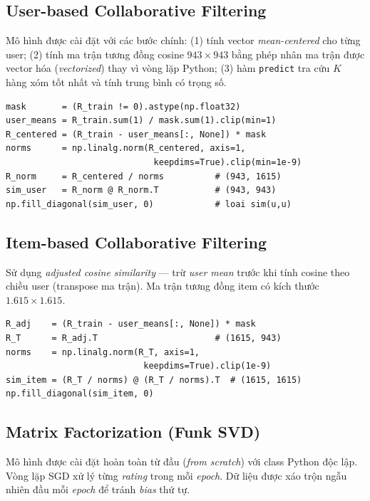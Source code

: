 \documentclass[../BTL.tex]{subfiles}
\begin{document}
\subsection{User-based Collaborative Filtering}
\label{section:3.6.1}

Mô hình được cài đặt với các bước chính: (1) tính vector
\textit{mean-centered} cho từng user; (2) tính ma trận tương đồng cosine
$943 \times 943$ bằng phép nhân ma trận được vector hóa (\textit{vectorized})
thay vì vòng lặp Python; (3) hàm \texttt{predict} tra cứu $K$ hàng xóm tốt
nhất và tính trung bình có trọng số.

\begin{lstlisting}[style=python, caption={Tính ma trận tương đồng
user-user (vectorized)}]
mask       = (R_train != 0).astype(np.float32)
user_means = R_train.sum(1) / mask.sum(1).clip(min=1)
R_centered = (R_train - user_means[:, None]) * mask
norms      = np.linalg.norm(R_centered, axis=1,
                             keepdims=True).clip(min=1e-9)
R_norm     = R_centered / norms          # (943, 1615)
sim_user   = R_norm @ R_norm.T           # (943, 943)
np.fill_diagonal(sim_user, 0)            # loai sim(u,u)
\end{lstlisting}

\subsection{Item-based Collaborative Filtering}
\label{section:3.6.2}

Sử dụng \textit{adjusted cosine similarity} — trừ \textit{user mean} trước
khi tính cosine theo chiều user (transpose ma trận). Ma trận tương đồng item
có kích thước $1.615 \times 1.615$.

\begin{lstlisting}[style=python, caption={\textit{Adjusted cosine
similarity} cho Item-based CF}]
R_adj    = (R_train - user_means[:, None]) * mask
R_T      = R_adj.T                       # (1615, 943)
norms    = np.linalg.norm(R_T, axis=1,
                           keepdims=True).clip(1e-9)
sim_item = (R_T / norms) @ (R_T / norms).T  # (1615, 1615)
np.fill_diagonal(sim_item, 0)
\end{lstlisting}

\subsection{Matrix Factorization (Funk SVD)}
\label{section:3.6.3}

Mô hình được cài đặt hoàn toàn từ đầu (\textit{from scratch}) với class
Python độc lập. Vòng lặp SGD xử lý từng \textit{rating} trong mỗi
\textit{epoch}. Dữ liệu được xáo trộn ngẫu nhiên đầu mỗi \textit{epoch} để
tránh \textit{bias} thứ tự.
\end{document}
